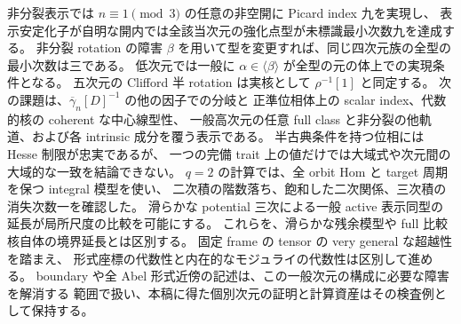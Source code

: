 \documentclass[11pt,a4paper]{ltjsarticle}
\numberwithin{equation}{section}
\begin{document}
非分裂表示では $n\equiv1\pmod3$ の任意の非空開に Picard index 九を実現し、
表示安定化子が自明な開内では全該当次元の強化点型が未標識最小次数九を達成する。
非分裂 rotation の障害 $\beta$ を用いて型を変更すれば、同じ四次元族の全型の最小次数は三である。
低次元では一般に $\alpha\in\langle\beta\rangle$ が全型の元の体上での実現条件となる。
五次元の Clifford 半 rotation は実核として $\rho^{-1}[1]$ と同定する。
次の課題は、$\overline\gamma_n[D]^{-1}$ の他の因子での分岐と
正準位相体上の scalar index、代数的核の coherent な中心線型性、
一般高次元の任意 full class と非分裂の他軌道、および各 intrinsic 成分を覆う表示である。
半古典条件を持つ位相には Hesse 制限が忠実であるが、
一つの完備 trait 上の値だけでは大域式や次元間の大域的な一致を結論できない。
$q=2$ の計算では、全 orbit Hom と target 周期を保つ integral 模型を使い、
二次積の階数落ち、飽和した二次関係、三次積の消失次数一を確認した。
滑らかな potential 三次による一般 active 表示同型の延長が局所尺度の比較を可能にする。
これらを、滑らかな残余模型や full 比較核自体の境界延長とは区別する。
固定 frame の tensor の very general な超越性を踏まえ、
形式座標の代数性と内在的なモジュライの代数性は区別して進める。
boundary や全 Abel 形式近傍の記述は、この一般次元の構成に必要な障害を解消する
範囲で扱い、本稿に得た個別次元の証明と計算資産はその検査例として保持する。


























\par\begingroup\small

\endgroup
\end{document}
